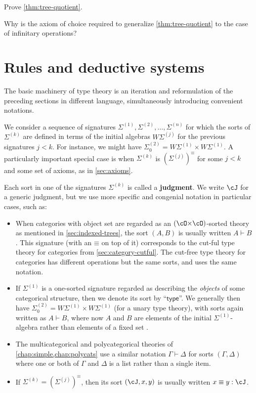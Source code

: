 \documentclass{book}
\def\sig{\Sigma}
\def\equivsym{\mathord{\equiv}}
\let\types\vdash
\begin{document}
\begin{ex}\label{ex:tree-quotient}
  Prove \cref{thm:tree-quotient}.
\end{ex}

\begin{ex}
  Why is the axiom of choice required to generalize \cref{thm:tree-quotient} to the case of infinitary operations?
\end{ex}


\section{Rules and deductive systems}
\label{sec:rules}

The basic machinery of type theory is an iteration and reformulation of the preceding sections in different language, simultaneously introducing convenient notations.

We consider a sequence of signatures $\sig^{(1)},\sig^{(2)},\dots,\sig^{(n)}$ for which the sorts of $\sig^{(k)}$ are defined in terms of the initial algebras $W\sig^{(j)}$ for the previous signatures $j<k$.
For instance, we might have $\sig^{(2)}_0 = W\sig^{(1)} \times W\sig^{(1)}$.
A particularly important special case is when $\sig^{(k)}$ is $(\sig^{(j)})^{\equivsym}$ for some $j<k$ and some set of axioms, as in \cref{sec:axioms}.

Each sort in one of the signatures $\sig^{(k)}$ is called a \textbf{judgment}.
We write $\cJ$ for a generic judgment, but we use more specific and congenial notation in particular cases, such as:
\begin{itemize}
\item When categories with object set \cO are regarded as an $(\cO\times\cO)$-sorted theory as mentioned in \cref{sec:indexed-trees}, the sort $(A,B)$ is usually written $A\types B$.
  This signature (with an $\equivsym$ on top of it) corresponds to the cut-ful type theory for categories from \cref{sec:category-cutful}.
  The cut-free type theory for categories has different operations but the same sorts, and uses the same notation.
\item If $\sig^{(1)}$ is a one-sorted signature regarded as describing the \emph{objects} of some categorical structure, then we denote its sort by ``$\mathsf{type}$''.
  We generally then have $\sig^{(2)}_0 = W\sig^{(1)} \times W\sig^{(1)}$ (for a unary type theory), with sorts again written as $A\types B$, where now $A$ and $B$ are elements of the initial $\sig^{(1)}$-algebra rather than elements of a fixed set \cO.
\item The multicategorical and polycategorical theories of \cref{chap:simple,chap:polycats} use a similar notation $\Gamma\types\Delta$ for sorts $(\Gamma,\Delta)$ where one or both of $\Gamma$ and $\Delta$ is a list rather than a single item.
\item If $\sig^{(k)}=(\sig^{(j)})^{\equivsym}$, then its sort $(\cJ,x,y)$ is usually written $x\equiv y : \cJ$.
\end{itemize}
\end{document}
